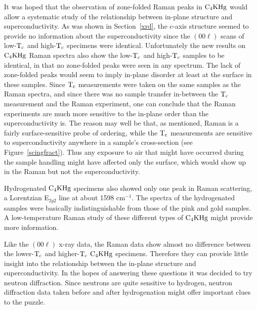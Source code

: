         It was  hoped that the  observation of  zone-folded Raman peaks  in
$\rm C_4KHg$ would  allow  a systematic study  of the relationship  between
in-plane   structure    and superconductivity.      As    was   shown    in
Section~\ref{xrd},  the c-axis structure seemed  to provide  no information
about the superconductivity since the $(00\ell)$ scans of low-$\rm T_c$ and
high-$\rm T_c$ specimens were identical.  Unfortunately  the new results on
$\rm C_4KHg$ Raman  spectra also show  the low-$\rm T_c$ and high-$\rm T_c$
samples to be identical, in that  no  zone-folded  peaks were  seen  in any
spectrum.  The lack of  zone-folded   peaks would seem   to  imply in-plane
disorder at  least at  the  surface  in these  samples.   Since  $\rm  T_c$
measurements were taken on the same samples as the Raman spectra, and since
there was no sample transfer in-between the  $\rm  T_c$ measurement and the
Raman experiment, one can conclude that the Raman experiments are much more
sensitive to the in-plane order than the superconductivity  is.  The reason
may well be that, as  mentioned, Raman is a fairly  surface-sensitive probe
of    ordering, while  the $\rm    T_c$   measurements are   sensitive   to
superconductivity anywhere in  a sample's cross-section  (see Figure~\ref{scingfract}).  Thus any exposure
to  air that might  have occurred  during  the sample  handling might  have
affected only the surface,  which  would  show up in the  Raman but not the
superconductivity.

        Hydrogenated $\rm C_4KHg$ specimens also showed only one peak in
Raman scattering, a Lorentzian E$_{2g2}$ line at about 1598 cm$^{-1}$.  The
spectra of the hydrogenated samples were basically indistinguishable from
those of the pink and gold samples.  A low-temperature Raman study of these
different types of $\rm C_4KHg$ might provide more information.

        Like  the  $(00\ell)$  x-ray data,  the  Raman data show  almost no
difference between the lower-$\rm  T_c$  and higher-$\rm T_c$ $\rm  C_4KHg$
specimens.  Therefore they can provide little insight into the relationship
between the in-plane   structure and superconductivity.  In  the  hopes  of
answering these questions it was decided to  try neutron diffraction. Since
neutrons are quite sensitive  to  hydrogen, neutron diffraction data  taken
before and after hydrogenation might offer important clues to the puzzle.
